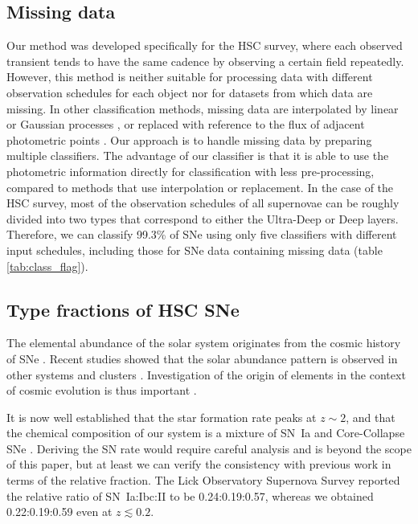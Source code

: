\documentclass[useamsfonts]{pasj01}
\begin{document}
\subsection{Missing data}
%
Our method was developed specifically for the HSC survey, where each observed transient tends to have the same cadence by observing a certain field repeatedly.
However, this method is neither suitable for processing data with different observation schedules for each object nor for datasets from which data are missing.
In other classification methods, missing data are interpolated by linear or Gaussian processes \citep{Lochner_2016,Muthukrishna_2019}, or replaced with reference to the flux of adjacent photometric points \citep{charnock17a}.
Our approach is to handle missing data by preparing multiple classifiers.
The advantage of our classifier is that it is able to use the photometric information directly for classification with less pre-processing, compared to methods that use interpolation or replacement.
In the case of the HSC survey, most of the observation schedules of all supernovae can be roughly divided into two types that correspond to either the Ultra-Deep or Deep layers.
Therefore, we can classify 99.3\% of SNe using only five classifiers with different input schedules, including those for SNe data containing missing data (table \ref{tab:class_flag}).
%
%
%
\subsection{Type fractions of HSC SNe}
The elemental abundance of the solar system \citep{grevesse98a} originates from the cosmic history of SNe \citep{maraston05a,kobayashi00a}.  
Recent studies showed that the solar abundance pattern is observed in other systems \citep{ramirez09a} and clusters \citep{mernier18a}. 
Investigation of the origin of elements in the context of cosmic evolution is thus important \citep{fukugita04a}.

It is now well established that the star formation rate peaks at $z\sim2$, and that the chemical composition of our system is a mixture of SN~Ia and Core-Collapse SNe \citep{tsujimoto95a,kobayashi11a}.
Deriving the SN rate would require careful analysis \citep{dilday08a,brown19a,frohmaier19a} and is beyond the scope of this paper, but at least we can verify the consistency with previous work in terms of the relative fraction.
The Lick Observatory Supernova Survey \citep{li11a} reported the relative ratio of SN~Ia:Ibc:II to be 0.24:0.19:0.57, whereas we obtained 0.22:0.19:0.59 even at $z\lesssim0.2$.
\end{document}
